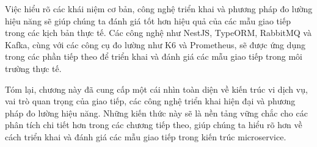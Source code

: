 Việc hiểu rõ các khái niệm cơ bản, công nghệ triển khai và phương pháp đo lường hiệu năng sẽ giúp chúng ta đánh giá tốt hơn hiệu quả của các mẫu giao tiếp trong các kịch bản thực tế. Các công nghệ như NestJS, TypeORM, RabbitMQ và Kafka, cùng với các công cụ đo lường như K6 và Prometheus, sẽ được ứng dụng trong các phần tiếp theo để triển khai và đánh giá các mẫu giao tiếp trong môi trường thực tế.

Tóm lại, chương này đã cung cấp một cái nhìn toàn diện về kiến trúc vi dịch vụ, vai trò quan trọng của giao tiếp, các công nghệ triển khai hiện đại và phương pháp đo lường hiệu năng. Những kiến thức này sẽ là nền tảng vững chắc cho các phân tích chi tiết hơn trong các chương tiếp theo, giúp chúng ta hiểu rõ hơn về cách triển khai và đánh giá các mẫu giao tiếp trong kiến trúc microservice.
